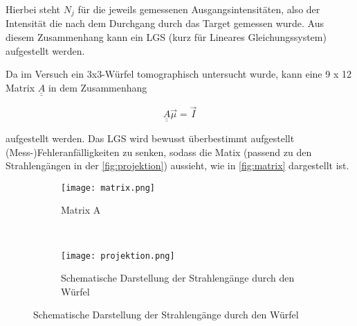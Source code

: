Hierbei steht $N_j$ für die jeweils gemessenen Ausgangsintensitäten, also der Intensität die nach dem Durchgang durch das Target gemessen wurde.
 Aus diesem Zusammenhang kann ein LGS (kurz für Lineares Gleichungssystem) aufgestellt werden.

\noindent
Da im Versuch ein 3x3-Würfel tomographisch untersucht wurde, kann eine 9 x 12 Matrix $\underline{\underline{A}}$ in dem Zusammenhang 

\begin{equation}
  \underline{\underline{A}} \vec{\mu} = \vec{I} 
  \label{eqn:matrix}
\end{equation}

aufgestellt werden. Das LGS wird bewusst überbestimmt aufgestellt (Mess-)Fehleranfälligkeiten zu senken, sodass die Matix (passend zu den Strahlengängen in der
\autoref{fig:projektion}) aussieht, wie in \autoref{fig:matrix} dargestellt ist.

\begin{figure}[H]
	\centering
	\begin{subfigure}[b]{0.45\textwidth}
		\centering
		\texttt{[image: matrix.png]}
		\caption{Matrix A}
    \label{fig:matrix}
	\end{subfigure}
	~
	\begin{subfigure}[b]{0.45\textwidth}
		\centering
		\texttt{[image: projektion.png]}
		\caption{Schematische Darstellung der Strahlengänge durch den Würfel}
    \label{fig:projektion}
	\end{subfigure}
\end{figure}

